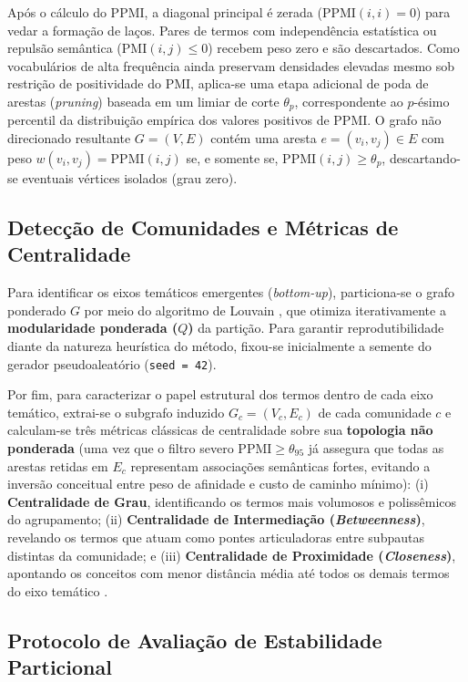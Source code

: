 \documentclass[12pt]{article}
\begin{document}
Após o cálculo do PPMI, a diagonal principal é zerada ($\text{PPMI}(i, i) = 0$) para vedar a formação de laços. Pares de termos com independência estatística ou repulsão semântica ($\text{PMI}(i,j) \le 0$) recebem peso zero e são descartados. Como vocabulários de alta frequência ainda preservam densidades elevadas mesmo sob restrição de positividade do PMI, aplica-se uma etapa adicional de poda de arestas (\textit{pruning}) baseada em um limiar de corte $\theta_p$, correspondente ao $p$-ésimo percentil da distribuição empírica dos valores positivos de PPMI. O grafo não direcionado resultante $G = (V, E)$ contém uma aresta $e = (v_i, v_j) \in E$ com peso $w(v_i, v_j) = \text{PPMI}(i, j)$ se, e somente se, $\text{PPMI}(i, j) \ge \theta_p$, descartando-se eventuais vértices isolados (grau zero).

\subsection{Detecção de Comunidades e Métricas de Centralidade}

Para identificar os eixos temáticos emergentes (\textit{bottom-up}), particiona-se o grafo ponderado $G$ por meio do algoritmo de Louvain \cite{blondel2008}, que otimiza iterativamente a \textbf{modularidade ponderada ($Q$)} da partição. Para garantir reprodutibilidade diante da natureza heurística do método, fixou-se inicialmente a semente do gerador pseudoaleatório (\texttt{seed = 42}).

Por fim, para caracterizar o papel estrutural dos termos dentro de cada eixo temático, extrai-se o subgrafo induzido $G_c = (V_c, E_c)$ de cada comunidade $c$ e calculam-se três métricas clássicas de centralidade sobre sua \textbf{topologia não ponderada} (uma vez que o filtro severo $\text{PPMI} \ge \theta_{95}$ já assegura que todas as arestas retidas em $E_c$ representam associações semânticas fortes, evitando a inversão conceitual entre peso de afinidade e custo de caminho mínimo): (i) \textbf{Centralidade de Grau}, identificando os termos mais volumosos e polissêmicos do agrupamento; (ii) \textbf{Centralidade de Intermediação (\textit{Betweenness})}, revelando os termos que atuam como pontes articuladoras entre subpautas distintas da comunidade; e (iii) \textbf{Centralidade de Proximidade (\textit{Closeness})}, apontando os conceitos com menor distância média até todos os demais termos do eixo temático \cite{kim2011,schaeffer2007,girvan2002}.

\subsection{Protocolo de Avaliação de Estabilidade Particional}
\end{document}
